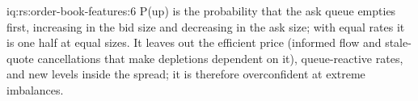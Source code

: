 \begin{solution}{iq:rs:order-book-features:6}
P(up) is the probability that the ask queue empties first, increasing in the bid size and decreasing in the ask size; with equal rates it is
one half at equal sizes. It leaves out the efficient price (informed flow and stale-quote cancellations that make depletions dependent on
it), queue-reactive rates, and new levels inside the spread; it is therefore overconfident at extreme imbalances.
\end{solution}
